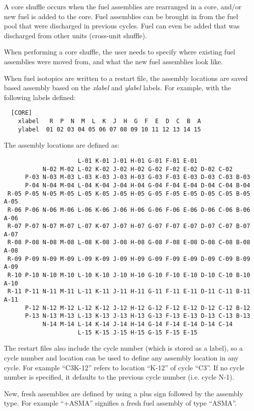 A core shuffle occurs when the fuel assemblies are rearranged in a core, and/or new fuel is added to the core.
Fuel assemblies can be brought in from the fuel pool that were discharged in previous cycles.
Fuel can even be added that was discharged from other units (cross-unit shuffle).

When performing a core shuffle, the user needs to specify where existing fuel assemblies were moved from, 
and what the new fuel assemblies look like.

When fuel isotopics are written to a restart file, the assembly locations are saved 
based assembly based on the {\it xlabel} and {\it ylabel} labels.
For example, with the following labels defined:
\begin{verbatim}
  [CORE]
    xlabel   R  P  N  M  L  K  J  H  G  F  E  D  C  B  A
    ylabel  01 02 03 04 05 06 07 08 09 10 11 12 13 14 15
\end{verbatim}
The assembly locations are defined as:
\begin{verbatim}
                     L-01 K-01 J-01 H-01 G-01 F-01 E-01
           N-02 M-02 L-02 K-02 J-02 H-02 G-02 F-02 E-02 D-02 C-02
      P-03 N-03 M-03 L-03 K-03 J-03 H-03 G-03 F-03 E-03 D-03 C-03 B-03
      P-04 N-04 M-04 L-04 K-04 J-04 H-04 G-04 F-04 E-04 D-04 C-04 B-04
 R-05 P-05 N-05 M-05 L-05 K-05 J-05 H-05 G-05 F-05 E-05 D-05 C-05 B-05 A-05
 R-06 P-06 N-06 M-06 L-06 K-06 J-06 H-06 G-06 F-06 E-06 D-06 C-06 B-06 A-06
 R-07 P-07 N-07 M-07 L-07 K-07 J-07 H-07 G-07 F-07 E-07 D-07 C-07 B-07 A-07
 R-08 P-08 N-08 M-08 L-08 K-08 J-08 H-08 G-08 F-08 E-08 D-08 C-08 B-08 A-08
 R-09 P-09 N-09 M-09 L-09 K-09 J-09 H-09 G-09 F-09 E-09 D-09 C-09 B-09 A-09
 R-10 P-10 N-10 M-10 L-10 K-10 J-10 H-10 G-10 F-10 E-10 D-10 C-10 B-10 A-10
 R-11 P-11 N-11 M-11 L-11 K-11 J-11 H-11 G-11 F-11 E-11 D-11 C-11 B-11 A-11
      P-12 N-12 M-12 L-12 K-12 J-12 H-12 G-12 F-12 E-12 D-12 C-12 B-12
      P-13 N-13 M-13 L-13 K-13 J-13 H-13 G-13 F-13 E-13 D-13 C-13 B-13
           N-14 M-14 L-14 K-14 J-14 H-14 G-14 F-14 E-14 D-14 C-14
                     L-15 K-15 J-15 H-15 G-15 F-15 E-15
\end{verbatim}
The restart files also include the cycle number (which is stored as a label), so
a cycle number and location can be used to define any assembly location in any cycle.
For example ``C3K-12'' refers to location ``K-12'' of cycle ``C3''.  If no cycle
number is specified, it defaults to the previous cycle number (i.e. cycle N-1).

New, fresh assemblies are defined by using a plus sign followed by the assembly type.
For example ``+ASMA'' signifies a fresh fuel assembly of type ``ASMA''.

